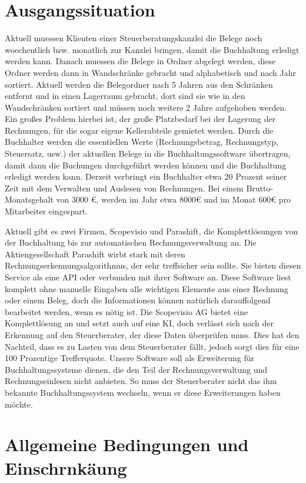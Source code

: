 \documentclass[12pt]{article}
\theoremstyle{definition}
\begin{document}
\section{Ausgangssituation}
Aktuell muessen Klienten einer Steuerberatungskanzlei die Belege noch woechentlich bzw. monatlich zur Kanzlei bringen, damit die Buchhaltung erledigt werden kann. 
Danach muessen die Belege in Ordner abgelegt werden, diese Ordner werden dann in Wandschränke gebracht und alphabetisch und nach Jahr sortiert. Aktuell werden die Belegordner nach 5 Jahren aus den Schränken entfernt und in einen Lagerraum gebracht, dort sind sie wie in den Wandschränken sortiert und müssen noch weitere 2 Jahre aufgehoben werden. Ein großes Problem hierbei ist, der große Platzbedarf bei der Lagerung der Rechnungen, für die sogar eigene Kellerabteile gemietet werden.
Durch die Buchhalter werden die essentiellen Werte (Rechnungsbetrag, Rechnungstyp, Steuersatz, usw.) der aktuellen Belege in die Buchhaltungssoftware übertragen, damit dann die Buchungen durchgeführt werden können und die Buchhaltung erledigt werden kann.
Derzeit verbringt ein Buchhalter etwa 20 Prozent seiner Zeit mit dem Verwalten und Auslesen von Rechnungen. Bei einem Brutto-Monatsgehalt von 3000 €, werden im Jahr etwa 8000€ und im Monat 600€ pro Mitarbeiter eingespart.

Aktuell gibt es zwei Firmen, Scopevisio und Parashift, die Komplettlösungen von der Buchhaltung bis zur automatischen Rechnungsverwaltung an. 
Die Aktiengesellschaft Parashift wirbt stark mit deren Rechnungserkennungsalgorithmus, der sehr treffsicher sein sollte. Sie bieten diesen Service als eine API oder verbunden mit ihrer Software an. Diese Software liest komplett ohne manuelle Eingaben alle wichtigen Elemente aus einer Rechnung oder einem Beleg, doch die Informationen können natürlich darauffolgend bearbeitet werden, wenn es nötig ist.
Die Scopevisio AG bietet eine Komplettlösung an und setzt auch auf eine KI, doch verlässt sich nach der Erkennung auf den Steuerberater, der diese Daten überprüfen muss. Dies hat den Nachteil, dass es zu Lasten von dem Steuerberater fällt, jedoch sorgt dies für eine 100 Prozentige Trefferquote. 
Unsere Software soll als Erweiterung für Buchhaltungssysteme dienen, die den Teil der Rechnungsverwaltung und Rechnungseinlesen nicht anbieten. So muss der Steuerberater nicht das ihm bekannte Buchhaltungssystem wechseln, wenn er diese Erweiterungen haben möchte.
\pagebreak

\section{Allgemeine Bedingungen und Einschrnkäung}
\end{document}
